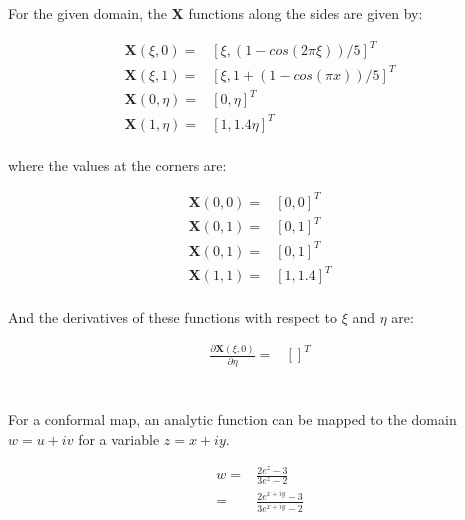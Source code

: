 \documentclass[10pt]{article}
\begin{document}
For the given domain, the \textbf{X} functions along the sides are given by:

\begin{equation}
\begin{aligned}
\textbf{X}(\xi, 0)=& \left\lbrack\xi, (1-cos(2\pi\xi))/5\right\rbrack^T\\
\textbf{X}(\xi, 1)=& \left\lbrack\xi, 1+(1-cos(\pi x))/5\right\rbrack^T\\
\textbf{X}(0, \eta)=& \left\lbrack0, \eta\right\rbrack^T\\
\textbf{X}(1, \eta)=& \left\lbrack1, 1.4\eta\right\rbrack^T\\
\end{aligned}
\end{equation}

where the values at the corners are:

\begin{equation}
\begin{aligned}
\textbf{X}(0, 0)=& \left\lbrack0, 0\right\rbrack^T\\
\textbf{X}(0, 1)=& \left\lbrack0, 1\right\rbrack^T\\
\textbf{X}(0, 1)=& \left\lbrack0, 1\right\rbrack^T\\
\textbf{X}(1, 1)=& \left\lbrack1, 1.4\right\rbrack^T\\
\end{aligned}
\end{equation}

And the derivatives of these functions with respect to \(\xi\) and \(\eta\) are:

\begin{equation}
\begin{aligned}
\frac{\partial\textbf{X}(\xi, 0)}{\partial\eta}=& \left\lbrack\right\rbrack^T
\end{aligned}
\end{equation}

\section{}

For a conformal map, an analytic function can be mapped to the domain \(w=u+iv\) for a variable \(z=x+iy\).

\begin{equation}
\begin{aligned}
w=&\frac{2e^z-3}{3e^z-2}\\
=& \frac{2e^{x+iy}-3}{3e^{x+iy}-2}\\
\end{aligned}
\end{equation}
\end{document}
